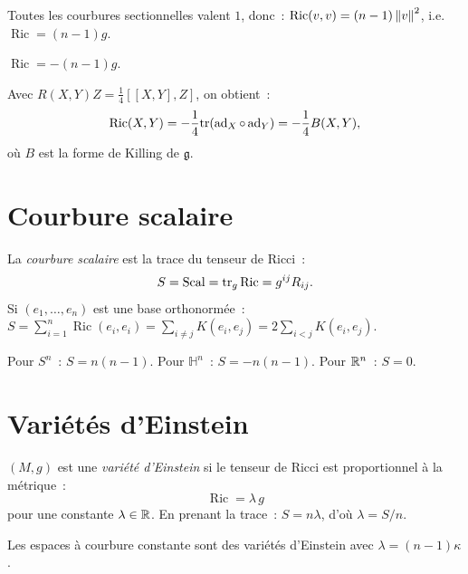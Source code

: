 \begin{exemple}[Ricci de $S^n$]
Toutes les courbures sectionnelles valent $1$, donc~:
$\operatorname{Ric}(v,v) = (n-1)\left\| v \right\|^2$, i.e.\ $\operatorname{Ric} = (n-1)g$.
\end{exemple}

\begin{exemple}
$\operatorname{Ric} = -(n-1)g$.
\end{exemple}

\begin{exemple}
Avec $R(X,Y)Z = \frac{1}{4}[[X,Y],Z]$, on obtient~:
\[
    \operatorname{Ric}(X,Y) = -\frac{1}{4}\mathrm{tr}(\operatorname{ad}_X \circ \operatorname{ad}_Y)
    = -\frac{1}{4}B(X,Y),
\]
o\`u $B$ est la forme de Killing de $\mathfrak{g}$.
\end{exemple}

\section{Courbure scalaire}

\begin{definition}
La \emph{courbure scalaire} est la trace du tenseur de Ricci~:
\[
    S = \operatorname{Scal} = \mathrm{tr}_g \operatorname{Ric} = g^{ij} R_{ij}.
\]
Si $(e_1, \ldots, e_n)$ est une base orthonorm\'ee~:
$S = \sum_{i=1}^n \operatorname{Ric}(e_i, e_i) = \sum_{i \neq j} K(e_i, e_j)
= 2\sum_{i < j} K(e_i, e_j)$.
\end{definition}

\begin{exemple}
Pour $S^n$~: $S = n(n-1)$. Pour $\mathbb{H}^n$~: $S = -n(n-1)$. Pour $\mathbb{R}^n$~: $S = 0$.
\end{exemple}

\section{Vari\'et\'es d'Einstein}

\begin{definition}
$(M, g)$ est une \emph{vari\'et\'e d'Einstein} si le tenseur de Ricci est
proportionnel \`a la m\'etrique~:
\[
    \operatorname{Ric} = \lambda\, g
\]
pour une constante $\lambda \in \mathbb{R}$. En prenant la trace~: $S = n\lambda$,
d'o\`u $\lambda = S/n$.
\end{definition}

\begin{exemple}
Les espaces \`a courbure constante sont des vari\'et\'es d'Einstein avec
$\lambda = (n-1)\kappa$.
\end{exemple}


